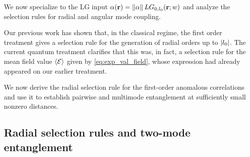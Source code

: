\documentclass[%
 reprint,
 amsmath,amssymb,
 aps,
pra,
twocolumn,
]{revtex4-2}
\begin{document}
We now specialize to the LG input $\alpha(\mathbf r)=\norm{\alpha}\,LG_{0,l_0}(\mathbf r;w)$ and analyze the selection rules for radial and angular mode coupling.

Our previous work \cite{Oliveira2023} has shown that, in the classical regime, the first order treatment gives a selection rule for the generation of radial orders up to $\abs{l_0}$. The current quantum treatment clarifies that this was, in fact, a selection rule for the mean field value $\expval{\mathcal{E}}$ given by \eqref{eq:exp_val_field}, whose expression had already appeared on our earlier treatment.

We now derive the radial selection rule for the first-order anomalous correlations and use it to establish pairwise and multimode entanglement at sufficiently small nonzero distances.

\subsection{Radial selection rules and two-mode entanglement}
\end{document}

